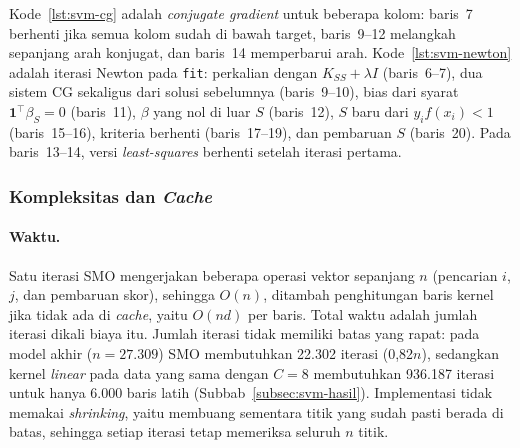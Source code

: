 

Kode~\ref{lst:svm-cg} adalah \textit{conjugate gradient} untuk beberapa kolom: baris~7 berhenti jika semua kolom sudah di bawah target, baris~9--12 melangkah sepanjang arah konjugat, dan baris~14 memperbarui arah. Kode~\ref{lst:svm-newton} adalah iterasi Newton pada \texttt{fit}: perkalian dengan $K_{SS} + \lambda I$ (baris~6--7), dua sistem CG sekaligus dari solusi sebelumnya (baris~9--10), bias dari syarat $\mathbf{1}^{\top}\beta_S = 0$ (baris~11), $\beta$ yang nol di luar $S$ (baris~12), $S$ baru dari $y_i f(x_i) < 1$ (baris~15--16), kriteria berhenti (baris~17--19), dan pembaruan $S$ (baris~20). Pada baris~13--14, versi \textit{least-squares} berhenti setelah iterasi pertama.



\subsubsection{Kompleksitas dan \textit{Cache}}
\paragraph{Waktu.} Satu iterasi SMO mengerjakan beberapa operasi vektor sepanjang $n$ (pencarian $i$, $j$, dan pembaruan skor), sehingga $O(n)$, ditambah penghitungan baris kernel jika tidak ada di \textit{cache}, yaitu $O(nd)$ per baris. Total waktu adalah jumlah iterasi dikali biaya itu. Jumlah iterasi tidak memiliki batas yang rapat: pada model akhir ($n = 27.309$) SMO membutuhkan 22.302 iterasi (0,82$n$), sedangkan kernel \textit{linear} pada data yang sama dengan $C = 8$ membutuhkan 936.187 iterasi untuk hanya 6.000 baris latih (Subbab~\ref{subsec:svm-hasil}). Implementasi tidak memakai \textit{shrinking}, yaitu membuang sementara titik yang sudah pasti berada di batas, sehingga setiap iterasi tetap memeriksa seluruh $n$ titik.

